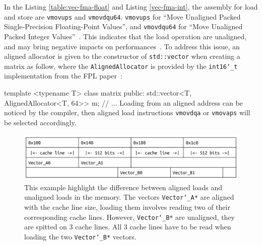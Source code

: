 \documentclass[logo,bsc,singlespacing,parskip]{infthesis}
\newcommand{\dtshort}{\texttt{int16\char`_t}}
\newcommand{\zmm}{\texttt{ZMM}}
\newenvironment{VerbatimCompact}
  {\vspace*{-2.5mm}\VerbatimEnvironment
   \par\Verbatim}
  {\endVerbatim\vspace*{-2.4mm}}
\begin{document}

In the Listing \ref{table:vec-fma-float} and Listing \ref{vec-fma-int}, the
assembly for load and store are \texttt{vmovups} and \texttt{vmovdqu64}.
\texttt{vmovups} for ``Move Unaligned Packed Single-Precision Floating-Point
Values'', and \texttt{vmovdqu64} for ``Move Unaligned Packed Integer
Values''~\cite{instruction}. This indicates that the load operation are unaligned,
and may bring negative impacts on performances~\cite{Unaligned}. 
To address this issue, an aligned allocator is given to the constructor of
\texttt{std::vector} when creating a matrix as follow, where the
\texttt{AlignedAllocator} is provided by the \dtshort{} implementation from the
FPL paper~\cite{FPL2}:
\begin{VerbatimCompact}
template <typename T>
class matrix {
public:
  std::vector<T, AlignedAllocator<T, 64>> m;
  // ...
}
\end{VerbatimCompact}
Loading from an aligned address can be noticed by the compiler, then aligned
load instructions \texttt{vmovdqa} or \texttt{vmovaps} will be selected
accordingly. 

\begin{figure} [H]
    \begin{center}
        \includegraphics[width=\linewidth]{image/cacheline.png}
    \end{center}
    \caption{This example highlight the difference between 
    aligned loads and unaligned loads in the memory. 
    The vectors \texttt{Vector\char`_A*} are aligned 
    with the cache line size, loading them involves reading two of their 
    corresponding cache lines.
    However, \texttt{Vector\char`_B*}
    are unaligned, they are spitted on 3 cache lines. All 3 cache lines have to be
    read when loading the two \texttt{Vector\char`_B*} vectors. 
    }
    \label{fig:cacheline}
\end{figure}

\end{document}
